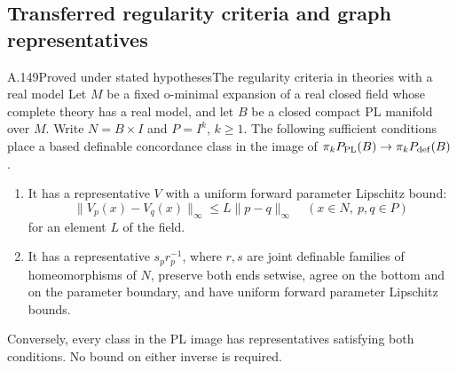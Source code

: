 \subsection{Transferred regularity criteria and graph representatives}

\begin{saresult}{A.149}{Proved under stated hypotheses}{The regularity criteria in theories with a real model}
Let \(M\) be a fixed o-minimal expansion of a real closed field whose
complete theory has a real model, and let \(B\) be a closed compact PL
manifold over \(M\). Write \(N=B\times I\) and \(P=I^k\), \(k\geq1\).
The following sufficient conditions place a based definable
concordance class in the image of
\(\pi_kP_{\rm PL}(B)\to\pi_kP_{\rm def}(B)\).
\begin{enumerate}
\item It has a representative \(V\) with a uniform forward parameter
Lipschitz bound:
\[
 \|V_p(x)-V_q(x)\|_\infty\leq L\|p-q\|_\infty
 \quad(x\in N,\ p,q\in P)
\]
for an element \(L\) of the field.
\item It has a representative \(s_pr_p^{-1}\), where \(r,s\) are joint
definable families of homeomorphisms of \(N\), preserve both ends
setwise, agree on the bottom and on the parameter boundary, and have
uniform forward parameter Lipschitz bounds.
\end{enumerate}
Conversely, every class in the PL image has representatives satisfying
both conditions. No bound on either inverse is required.
\end{saresult}

